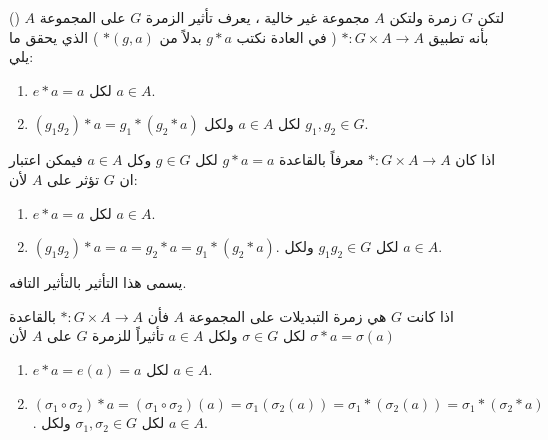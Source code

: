 		\begin{frame}
			\begin{definition}
				لتكن $G$ زمرة ولتكن $A$ مجموعة غير خالية ، يعرف تأثير الزمرة $G$ على المجموعة $A$
				\linebreak()
				بأنه تطبيق 
				$* : G \times A \to A$ ( في العادة نكتب $g*a$ بدلاً من $*(g, a)$ ) الذي يحقق ما يلي:
				\begin{enumerate}
					\item $e * a = a$ لكل $a\in A$.
					\item $(g_1g_2)*a = g_1 * (g_2 * a)$ لكل $a\in A$ ولكل $g_1,g_2 \in G$.
				\end{enumerate} 
			\end{definition}
			
			\begin{example}
				اذا كان $*:G\times A \to A$ معرفاً بالقاعدة 
				$g*a = a$ لكل $g\in G$ وكل $a\in A$ فيمكن اعتبار ان $G$ تؤثر على $A$ لأن:
				\begin{enumerate}
					\item $e*a=a$ لكل $a\in A$.
					\item $(g_1g_2)*a=a=g_2*a=g_1*(g_2*a)$. لكل $g_1g_2\in G$ ولكل $a\in A$.
				\end{enumerate}	
				يسمى هذا التأثير بالتأثير التافه.
			\end{example}
		\end{frame}
		
		\begin{frame}
			\begin{example}
				اذا كانت $G$ هي زمرة التبديلات على المجموعة $A$ فأن 
				$*:G\times A \to A$ بالقاعدة
				$\sigma * a = \sigma(a)$ لكل $\sigma\in G$ ولكل $a\in A$ تأثيراً للزمرة $G$ على $A$ لأن
				\begin{enumerate}
					\item $e * a = e(a) = a$ لكل $a \in A$.
					\item $(\sigma_1 \circ \sigma_2)*a = (\sigma_1\circ\sigma_2)(a) = \sigma_1(\sigma_2(a)) = \sigma_1*(\sigma_2(a)) = \sigma_1 * (\sigma_2 * a)$. لكل 
					$\sigma_1, \sigma_2 \in G$ ولكل $a\in A$.
				\end{enumerate}
			\end{example}
		\end{frame}
		
